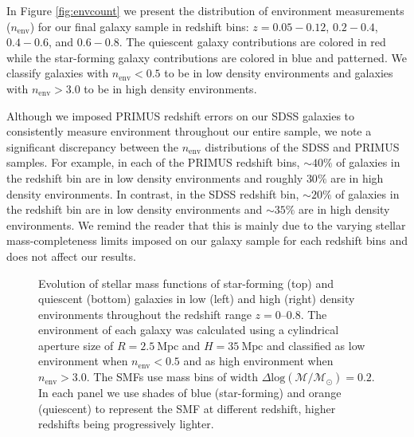 \documentclass{emulateapj}
\def \apradius{2.5}
\def \apheight{35}
\begin{document}
In Figure \ref{fig:envcount} we present the distribution of environment measurements ($n_{\mathrm{env}}$) for our final galaxy sample in redshift bins: $z = 0.05 - 0.12$, $0.2 - 0.4$, $0.4-0.6$, and $0.6-0.8$. The quiescent galaxy contributions are colored in red while the star-forming galaxy contributions are colored in blue and patterned. We classify galaxies with $n_{\mathrm{env}} < 0.5$ to be in low density environments and galaxies with $n_{\mathrm{env}} > 3.0$ to be in high density environments. 

Although we imposed PRIMUS redshift errors on our SDSS galaxies to consistently measure environment throughout our entire sample, we note a significant discrepancy between the $n_{\mathrm{env}}$ distributions of the SDSS and PRIMUS samples. For example, in each of the PRIMUS redshift bins, $\sim 40 \%$ of galaxies in the redshift bin are in low density environments and roughly $30 \%$ are in high density environments. In contrast, in the SDSS redshift bin, $\sim 20 \%$ of galaxies in the redshift bin are in low density environments and $\sim 35 \%$ are in high density environments. We remind the reader that this is mainly due to the varying stellar mass-completeness limits imposed on our galaxy sample for each redshift bins and does not affect our results. 
\begin{figure}
  \begin{center}
    \leavevmode
     \caption{Evolution of stellar mass functions of star-forming (top) and quiescent (bottom) galaxies in 
low (left) and high (right) density environments throughout the redshift range
$z=0$--$0.8$. The environment of each galaxy  
was calculated using a cylindrical aperture size of $R=\apradius \: \mathrm{Mpc}$ and $H=\apheight \: \mathrm{Mpc}$ and  
classified as low environment when $n_{\mathrm{env}} < 0.5$ and as high environment when $n_{\mathrm{env}} > 3.0$. The SMFs use mass bins of 
width $\Delta \mathrm{log}(\mathcal{M}/\mathcal{M}_{\odot})=0.2$. In each panel we use shades of blue 
(star-forming) and orange (quiescent) to represent the SMF at different redshift, higher redshifts being
progressively lighter.}      \label{fig:smf}
    \end{center}
\end{figure}
\end{document}
